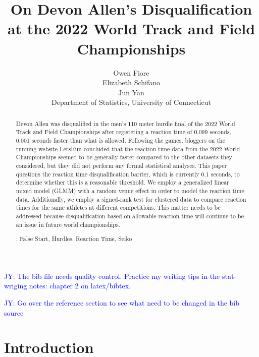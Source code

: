 \documentclass[12pt, letterpaper, titlepage]{article}
\title{On Devon Allen's Disqualification at the 2022 World Track and Field 
Championships}
\author{Owen Fiore\\
  Elizabeth Schifano\\
  Jun Yan\\[1ex]
  Department of Statistics, University of Connecticut\\
}
\date{}
\newcommand{\jy}[1]{\textcolor{blue}{JY: #1}}
\begin{document}
\maketitle

\begin{abstract}
Devon Allen was disqualified in the men's 110 meter hurdle final of the 2022
World Track and Field Championships after registering a reaction time of 0.099 
seconds, 0.001 seconds faster than what is allowed. Following the games, 
bloggers on the running website LetsRun concluded that the reaction time data 
from the 2022 World Championships seemed to be generally faster compared to the 
other datasets they considered, but they did not perform any formal 
statistical analyses. This paper questions the reaction time 
disqualification barrier, which is currently 0.1 seconds, to determine whether 
this is a reasonable threshold. We employ a generalized linear mixed model 
(GLMM) with a random venue effect in order to  model the reaction time data. 
Additionally, we employ a signed-rank test for clustered data to 
compare reaction times for the same athletes at different competitions. This 
matter needs to be addressed because disqualification based on allowable 
reaction time will continue to be an issue in future world championships.




\bigskip{}:
False Start, Hurdles, Reaction Time, Seiko 

\end{abstract}

\doublespace

\jy{The bib file needs quality control. Practice my writing tips in the
  stat-wriging notes: chapter 2 on latex/bibtex.}

\jy{Go over the reference section to see what need to be changed in the bib source}

\section{Introduction}
\label{sec:intro}
\end{document}
